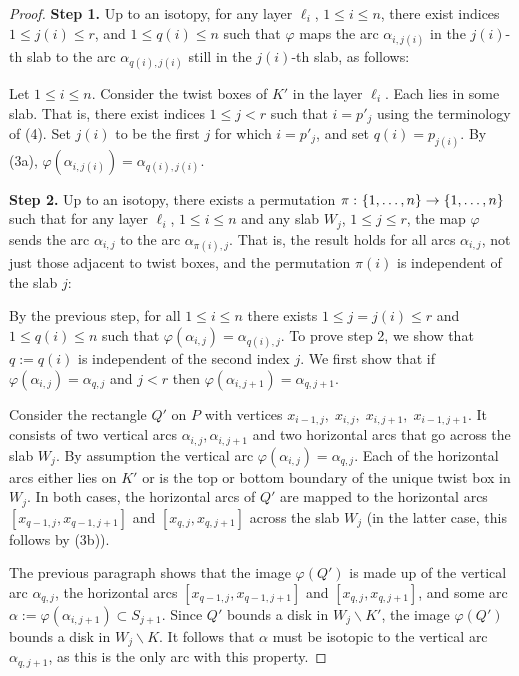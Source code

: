 \documentclass[12pt,reqno]{amsart}
\theoremstyle{plain}
\theoremstyle{definition}
\def\from{\thinspace\colon}
\newcommand{\ssm}{\smallsetminus}
\begin{document}
\begin{proof}
\textbf{Step 1.} Up to an isotopy, for any layer $\ell_i$, $1\le i\le n$, there exist indices 
$1\le j(i)\le r$, and $1\le q(i)\le n$ such that $\varphi$ maps the arc $\alpha_{i,j(i)}$ 
in the $j(i)$-th slab to the arc $\alpha_{q(i),j(i)}$ still in the $j(i)$-th slab, as follows:

Let $1\le i\le n$. Consider the twist boxes of $K'$ in the layer $\ell_i$. Each lies in 
some slab. That is, there exist indices $1\le j<r$ such that $i=p'_j$ using the terminology 
of (4). Set $j(i)$ to be the first $j$ for which $i=p'_j$, and set 
$q(i) = p_{j(i)}$. By (3a), 
$\varphi(\alpha_{i,j(i)})=\alpha_{q(i),j(i)}$.

\vskip7pt

\textbf{Step 2.} 
Up to an isotopy, there exists a permutation $\pi\from\{1,\dots,n\}\to \{1,\dots,n\}$ 
such that for any layer $\ell_i$, $1\le i\le n$ and any slab $W_j$, $1\le j\le r$, 
the map $\varphi$ sends the arc $\alpha_{i,j}$ to the arc $\alpha_{\pi(i),j}$. 
That is, the result holds for all arcs $\alpha_{i,j}$, not just those adjacent to 
twist boxes, and the permutation $\pi(i)$ is independent of the slab $j$:

By the previous step, for all $1\le i \le n$ there exists $1\le j=j(i)\le r$ and 
$1\le q(i)\le n$ such that $\varphi(\alpha_{i,j})=\alpha_{q(i),j}$. 
To prove step 2, we show that $q:=q(i)$ is independent of the second index $j$. 
We first show that if $\varphi(\alpha_{i,j}) = \alpha_{q,j}$ and $j<r$ then 
$\varphi(\alpha_{i,j+1})=\alpha_{q,j+1}$.

Consider the rectangle $Q'$ on $P$ with vertices $x_{i-1,j},\;x_{i,j},\;x_{i,j+1},\; x_{i-1,j+1}$.
It consists of two vertical arcs $\alpha_{i,j},\alpha_{i,j+1}$ and two horizontal arcs that go 
across the slab $W_j$. By assumption the vertical arc $\varphi(\alpha_{i,j})=\alpha_{q,j}$.
Each of the horizontal arcs either lies on $K'$ or is the top or bottom boundary of the unique 
twist box in $W_j$. In both cases, the horizontal arcs of $Q'$ are mapped to the horizontal 
arcs $[x_{q-1,j},x_{q-1,j+1}]$ and $[x_{q,j},x_{q,j+1}]$ across the slab $W_j$ (in the latter 
case, this follows by (3b)).

The previous paragraph shows that the image $\varphi(Q')$ is made up of the 
vertical arc $\alpha_{q,j}$, the horizontal arcs  $[x_{q-1,j},x_{q-1,j+1}]$ and
$[x_{q,j},x_{q,j+1}]$, and some arc $\alpha := 
\varphi(\alpha_{i,j+1})\subset S_{j+1}$.  Since $Q'$ bounds a disk in $W_j\ssm K'$, 
the image $\varphi(Q')$ bounds a disk in $W_j \ssm K$. It follows that $\alpha$ must 
be isotopic to the vertical arc $\alpha_{q,j+1}$, as this is the only arc with 
this property.


\end{proof}
\end{document}
